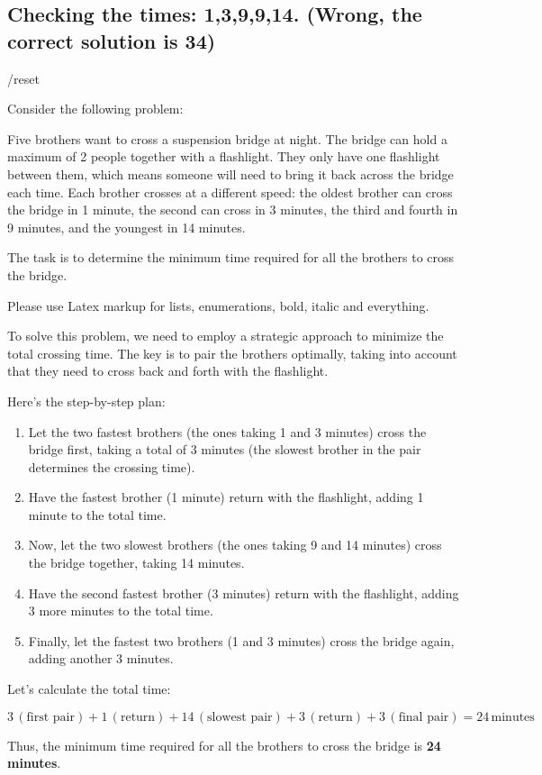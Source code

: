 \subsection{Checking the times: 1,3,9,9,14. (Wrong, the correct solution is 34)}

\begin{ai}
/reset

Consider the following problem:

Five brothers want to cross a suspension bridge at night. The bridge can hold a
maximum of 2 people together with a flashlight. They only have one flashlight
between them, which means someone will need to bring it back across the bridge
each time. Each brother crosses at a different speed: the oldest brother can
cross the bridge in 1 minute, the second can cross in 3 minutes, the third and
fourth in 9 minutes, and the youngest in 14 minutes.

The task is to determine the minimum time required for all the brothers to cross
the bridge.

Please use Latex markup for lists, enumerations, bold, italic and everything.
\end{ai}

\begin{airesult}
To solve this problem, we need to employ a strategic approach to minimize the
total crossing time. The key is to pair the brothers optimally, taking into
account that they need to cross back and forth with the flashlight.

\vsp

Here's the step-by-step plan:

\begin{enumerate}
  \item Let the two fastest brothers (the ones taking 1 and 3 minutes) cross the
bridge first, taking a total of 3 minutes (the slowest brother in the pair
determines the crossing time).
  \item Have the fastest brother (1 minute) return with the flashlight, adding 1
minute to the total time.
  \item Now, let the two slowest brothers (the ones taking 9 and 14 minutes)
cross the bridge together, taking 14 minutes.
  \item Have the second fastest brother (3 minutes) return with the flashlight,
adding 3 more minutes to the total time.
  \item Finally, let the fastest two brothers (1 and 3 minutes) cross the bridge
again, adding another 3 minutes.
\end{enumerate}

\vsp

Let's calculate the total time:

\[
3 \, (\text{first pair}) + 1 \, (\text{return}) + 14 \, (\text{slowest pair}) +
3 \, (\text{return}) + 3 \, (\text{final pair}) = 24 \, \text{minutes}
\]

Thus, the minimum time required for all the brothers to cross the bridge is
\textbf{24 minutes}.
\end{airesult}



